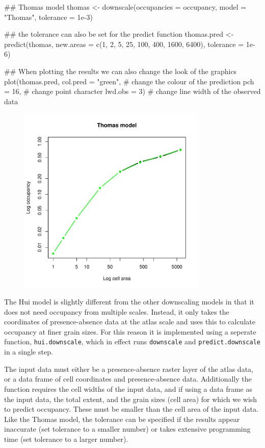\documentclass{article}[12pt, a4paper]
\begin{document}
\begin{Schunk}
\begin{Sinput}
## Thomas model
thomas <- downscale(occupancies = occupancy,
                    model = "Thomas",
                    tolerance = 1e-3)
                    
## the tolerance can also be set for the predict function
thomas.pred <- predict(thomas,
                       new.areas = c(1, 2, 5, 25, 100, 400, 1600, 6400),
                       tolerance = 1e-6)

## When plotting the results we can also change the look of the graphics
plot(thomas.pred,
     col.pred = "green",  # change the colour of the prediction
     pch = 16,            # change point character
     lwd.obs = 3)         # change line width of the observed data
\end{Sinput}
\end{Schunk}
\begin{figure}[!ht]
\centering
\includegraphics[width=9cm]{Downscaling-downscale16}
\end{figure}

The Hui model is slightly different from the other downscaling models in that it does not need occupancy from multiple scales. Instead, it only takes the coordinates of presence-absence data at the atlas scale and uses this to calculate occupancy at finer grain sizes. For this reason it is implemented using a seperate function, \texttt{hui.downscale}, which in effect runs \texttt{downscale} and \texttt{predict.downscale} in a single step. 

The input data must either be a presence-absence raster layer of the atlas data, or a data frame of cell coordinates and presence-absence data. Additionally the function requires the cell widths of the input data, and if using a data frame as the input data, the total extent, and the grain sizes (cell area) for which we wish to predict occupancy. These must be smaller than the cell area of the input data. Like the Thomas model, the tolerance can be specified if the results appear inaccurate (set tolerance to a smaller number) or takes extensive programming time (set tolerance to a larger number).
\end{document}
